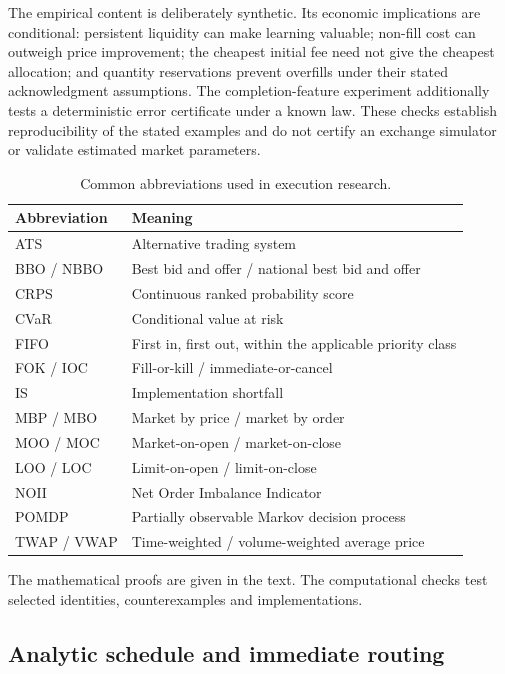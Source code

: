 \documentclass[11pt]{article}
\numberwithin{equation}{section}
\theoremstyle{definition}
\theoremstyle{remark}
\theoremstyle{definition}
\begin{document}
The empirical content is deliberately synthetic. Its economic implications
are conditional: persistent liquidity can make learning valuable; non-fill
cost can outweigh price improvement; the cheapest initial fee need not give
the cheapest allocation; and quantity reservations prevent overfills under
their stated acknowledgment assumptions. The completion-feature experiment
additionally tests a deterministic error certificate under a known law.
These checks establish reproducibility of the stated examples and do not
certify an exchange simulator or validate estimated market parameters.

\begin{table}[tb]
\centering\small
\caption{Common abbreviations used in execution research.}
\begin{tabularx}{\textwidth}{lY}
\toprule Abbreviation & Meaning \\\midrule
ATS & Alternative trading system \\
BBO / NBBO & Best bid and offer / national best bid and offer \\
CRPS & Continuous ranked probability score \\
CVaR & Conditional value at risk \\
FIFO & First in, first out, within the applicable priority class \\
FOK / IOC & Fill-or-kill / immediate-or-cancel \\
IS & Implementation shortfall \\
MBP / MBO & Market by price / market by order \\
MOO / MOC & Market-on-open / market-on-close \\
LOO / LOC & Limit-on-open / limit-on-close \\
NOII & Net Order Imbalance Indicator \\
POMDP & Partially observable Markov decision process \\
TWAP / VWAP & Time-weighted / volume-weighted average price \\
\bottomrule
\end{tabularx}
\end{table}

The mathematical proofs are given in the text. The computational checks test
selected identities, counterexamples and implementations.

\subsection{Analytic schedule and immediate routing}
\end{document}
